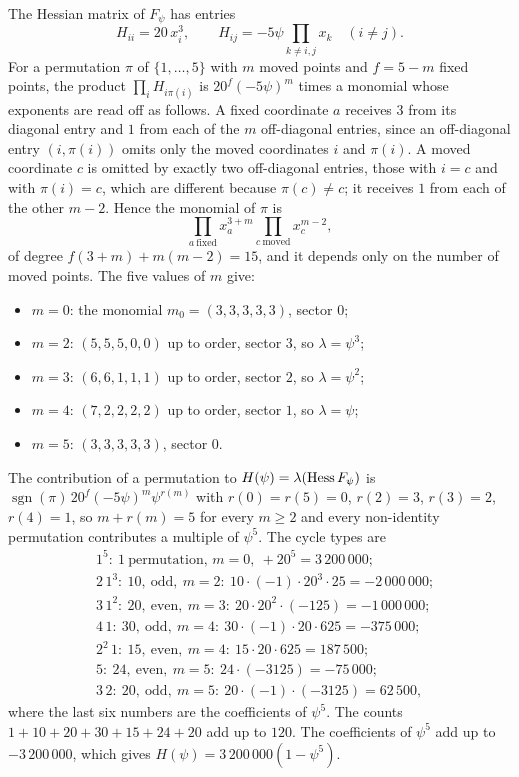 The Hessian matrix of $F_\psi$ has entries
\[
H_{ii}=20\,x_i^3,\qquad H_{ij}=-5\psi\prod_{k\ne i,j}x_k\quad(i\ne j).
\]
For a permutation $\pi$ of $\{1,\dots,5\}$ with $m$ moved points and
$f=5-m$ fixed points, the product $\prod_iH_{i\pi(i)}$ is
$20^f(-5\psi)^m$ times a monomial whose exponents are read off as follows.
A fixed coordinate $a$ receives $3$ from its diagonal entry and $1$ from each
of the $m$ off-diagonal entries, since an off-diagonal entry $(i,\pi(i))$
omits only the moved coordinates $i$ and $\pi(i)$. A moved coordinate $c$
is omitted by exactly two off-diagonal entries, those with $i=c$ and with
$\pi(i)=c$, which are different because $\pi(c)\ne c$; it receives $1$ from
each of the other $m-2$. Hence the monomial of $\pi$ is
\[
\prod_{a\ \mathrm{fixed}}x_a^{3+m}\prod_{c\ \mathrm{moved}}x_c^{m-2},
\]
of degree $f(3+m)+m(m-2)=15$, and it depends only on the number of moved
points. The five values of $m$ give:
\begin{itemize}[leftmargin=*,itemsep=1pt]
\item $m=0$: the monomial $m_0=(3,3,3,3,3)$, sector $0$;
\item $m=2$: $(5,5,5,0,0)$ up to order, sector $3$, so $\lambda=\psi^3$;
\item $m=3$: $(6,6,1,1,1)$ up to order, sector $2$, so $\lambda=\psi^2$;
\item $m=4$: $(7,2,2,2,2)$ up to order, sector $1$, so $\lambda=\psi$;
\item $m=5$: $(3,3,3,3,3)$, sector $0$.
\end{itemize}
The contribution of a permutation to $H(\psi)=\lambda(\operatorname{Hess} F_\psi)$ is
$\operatorname{sgn}(\pi)\,20^f(-5\psi)^m\psi^{r(m)}$ with $r(0)=r(5)=0$,
$r(2)=3$, $r(3)=2$, $r(4)=1$, so $m+r(m)=5$ for every $m\ge2$ and every
non-identity permutation contributes a multiple of $\psi^5$. The cycle
types are
\[
\begin{aligned}
&1^5:\ 1\ \text{permutation, }m=0,\ +20^5=3\,200\,000;\\
&2\,1^3:\ 10,\ \text{odd},\ m=2:\ 10\cdot(-1)\cdot20^3\cdot25=-2\,000\,000;\\
&3\,1^2:\ 20,\ \text{even},\ m=3:\ 20\cdot20^2\cdot(-125)=-1\,000\,000;\\
&4\,1:\ 30,\ \text{odd},\ m=4:\ 30\cdot(-1)\cdot20\cdot625=-375\,000;\\
&2^2\,1:\ 15,\ \text{even},\ m=4:\ 15\cdot20\cdot625=187\,500;\\
&5:\ 24,\ \text{even},\ m=5:\ 24\cdot(-3125)=-75\,000;\\
&3\,2:\ 20,\ \text{odd},\ m=5:\ 20\cdot(-1)\cdot(-3125)=62\,500,
\end{aligned}
\]
where the last six numbers are the coefficients of $\psi^5$. The counts
$1+10+20+30+15+24+20$ add up to $120$. The coefficients of $\psi^5$ add up
to $-3\,200\,000$, which gives $H(\psi)=3\,200\,000(1-\psi^5)$.

